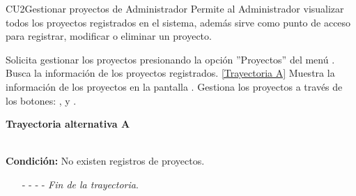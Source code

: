 	\begin{UseCase}{CU2}{Gestionar proyectos de Administrador}{
		Permite al Administrador visualizar todos los proyectos registrados en el sistema, además sirve como punto de acceso para registrar, modificar o eliminar un proyecto.
	}
	\end{UseCase}
	\begin{UCtrayectoria}
		\UCpaso[\UCactor] Solicita gestionar los proyectos presionando la opción ''Proyectos'' del menú .
		\UCpaso[\UCsist] Busca la información de los proyectos registrados. \hyperlink{CU2:TAA}{[Trayectoria A]}
		\UCpaso[\UCsist] Muestra la información de los proyectos en la pantalla .
		\UCpaso[\UCactor] Gestiona los proyectos a través de los botones: , \editar  y \eliminar. \label{P4}
	\end{UCtrayectoria}		
	\hypertarget{CU2:TAA}{\textbf{Trayectoria alternativa A}}\\
\noindent \textbf{Condición:} No existen registros de proyectos.
\begin{enumerate}
	\UCpaso[\UCsist] Muestra el mensaje  en la pantalla  para indicar que no hay registros de proyectos para mostrar.
	\item[- -] - - {\em {Fin de la trayectoria}}.%
\end{enumerate}

